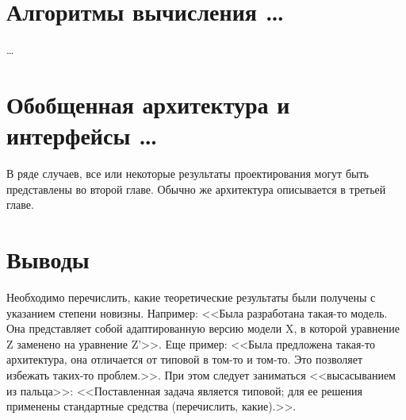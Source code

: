 \section{Алгоритмы вычисления \dots}

\dots





\section{Обобщенная архитектура и интерфейсы \dots}

В ряде случаев, все или некоторые результаты проектирования могут быть представлены во второй главе. Обычно же архитектура описывается в третьей главе.

\section{Выводы}

Необходимо перечислить, какие теоретические результаты были получены с указанием степени новизны. Например: <<Была разработана такая-то модель. Она представляет собой адаптированную версию модели X, в которой уравнение Z заменено на уравнение Z'>>. Еще пример: <<Была предложена такая-то архитектура, она отличается от типовой в том-то и том-то. Это позволяет избежать таких-то проблем.>>. При этом следует заниматься <<высасыванием из пальца>>: <<Поставленная задача является типовой; для ее решения применены стандартные средства (перечислить, какие).>>.